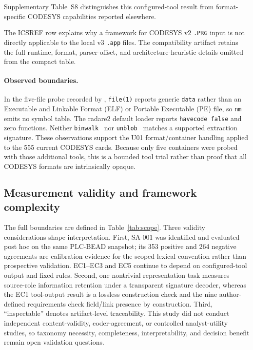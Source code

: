\documentclass[a4paper,fleqn]{cas-dc}
\begin{document}
Supplementary Table~S8 distinguishes this configured-tool result from format-specific CODESYS capabilities reported elsewhere.

The ICSREF row explains why a framework for CODESYS v2 \texttt{.PRG} input is not directly applicable to the local v3 \texttt{.app} files. The compatibility artifact retains the full runtime, format, parser-offset, and architecture-heuristic details omitted from the compact table.

\paragraph{Observed boundaries.} In the five-file probe recorded by , \texttt{file(1)} reports generic \texttt{data} rather than an Executable and Linkable Format (ELF) or Portable Executable (PE) file, so \texttt{nm} emits no symbol table. The radare2 default loader reports \texttt{havecode false} and zero functions. Neither \texttt{binwalk}~\citep{binwalk} nor \texttt{unblob}~\citep{unblob} matches a supported extraction signature. These observations support the U01 format/container handling applied to the 555 current CODESYS cards. Because only five containers were probed with those additional tools, this is a bounded tool trial rather than proof that all CODESYS formats are intrinsically opaque.

\subsection{Measurement validity and framework complexity}

The full boundaries are defined in Table~\ref{tab:scope}. Three validity considerations shape interpretation. First, SA-001 was identified and evaluated post hoc on the same PLC-BEAD snapshot; its 353 positive and 264 negative agreements are calibration evidence for the scoped lexical convention rather than prospective validation. EC1--EC3 and EC5 continue to depend on configured-tool output and fixed rules. Second, one nontrivial representation task measures source-role information retention under a transparent signature decoder, whereas the EC1 tool-output result is a lossless construction check and the nine author-defined requirements check field/link presence by construction. Third, ``inspectable'' denotes artifact-level traceability. This study did not conduct independent content-validity, coder-agreement, or controlled analyst-utility studies, so taxonomy necessity, completeness, interpretability, and decision benefit remain open validation questions.
\end{document}
